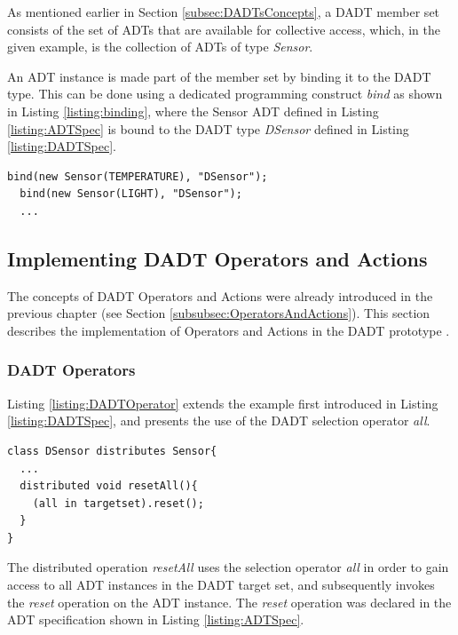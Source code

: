 As mentioned earlier in Section \ref{subsec:DADTsConcepts}, a DADT member set
consists of the set of ADTs that are available for collective
access, which, in the given example, is the collection of ADTs of type \emph{Sensor}.

An ADT instance is made part of the member set by binding it to the DADT type.
This can be done using a dedicated programming construct \emph{bind} as shown in
Listing \ref{listing:binding}, where the Sensor ADT defined in Listing
\ref{listing:ADTSpec} is bound to the DADT type \emph{DSensor} defined in Listing \ref{listing:DADTSpec}.
 
\begin{lstlisting}[frame=trbl, basewidth={0.55em, 0.6em}, captionpos=b, 
basicstyle=\ttfamily\footnotesize, breaklines, caption = Binding ADT instances to a DADT instance, label = listing:binding]
  bind(new Sensor(TEMPERATURE), "DSensor");
  bind(new Sensor(LIGHT), "DSensor");
  ...
\end{lstlisting} 


\subsection{Implementing DADT Operators and Actions}
\label{subsubsec:OperatorsAndActionsImpl}

The concepts of DADT Operators and Actions were already introduced in the
previous chapter (see Section \ref{subsubsec:OperatorsAndActions}). This
section describes the implementation of Operators and Actions in the DADT
prototype \cite{migliavacca_DADT:2006}.

\subsubsection{DADT Operators}
Listing \ref{listing:DADTOperator} extends the example first introduced in
Listing \ref{listing:DADTSpec}, and presents the use of the DADT selection
operator \emph{all}.

\begin{lstlisting}[frame=trbl, basewidth={0.55em, 0.6em}, captionpos=b, 
basicstyle=\ttfamily\footnotesize, breaklines, caption = Use of DADT Selection Operator, label = listing:DADTOperator]  
class DSensor distributes Sensor{
  ...
  distributed void resetAll(){
    (all in targetset).reset();
  }
}
\end{lstlisting}

The distributed operation \emph{resetAll} uses the selection operator 
\emph{all} in order to gain access to all ADT instances in the DADT
target set, and subsequently invokes the \emph{reset} operation on the ADT
instance. The \emph{reset} operation was declared in the ADT specification
shown in Listing \ref{listing:ADTSpec}.

